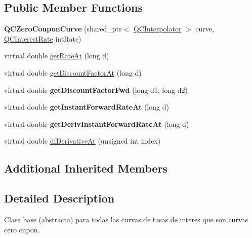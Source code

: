 \subsection*{Public Member Functions}
\begin{DoxyCompactItemize}
\item 
\hypertarget{class_q_c_zero_coupon_curve_a10de10b602b24f3d9bc73fbbe87f8e35}{{\bfseries Q\+C\+Zero\+Coupon\+Curve} (shared\+\_\+ptr$<$ \hyperlink{class_q_c_interpolator}{Q\+C\+Interpolator} $>$ curve, \hyperlink{class_q_c_interest_rate}{Q\+C\+Interest\+Rate} int\+Rate)}\label{class_q_c_zero_coupon_curve_a10de10b602b24f3d9bc73fbbe87f8e35}

\item 
virtual double \hyperlink{class_q_c_zero_coupon_curve_a83289d8e7ef3cacdc407820b715d9b19}{get\+Rate\+At} (long d)
\item 
virtual double \hyperlink{class_q_c_zero_coupon_curve_ac7546a18d2fe462e14ddae2d8c87b7c5}{get\+Discount\+Factor\+At} (long d)
\item 
\hypertarget{class_q_c_zero_coupon_curve_afebbe4bb5a7b76f3914842c212704fc1}{virtual double {\bfseries get\+Discount\+Factor\+Fwd} (long d1, long d2)}\label{class_q_c_zero_coupon_curve_afebbe4bb5a7b76f3914842c212704fc1}

\item 
\hypertarget{class_q_c_zero_coupon_curve_afa4667c45b9f07890f2ea4dd194c7470}{virtual double {\bfseries get\+Instant\+Forward\+Rate\+At} (long d)}\label{class_q_c_zero_coupon_curve_afa4667c45b9f07890f2ea4dd194c7470}

\item 
\hypertarget{class_q_c_zero_coupon_curve_a10067b1cccec8446ad5d540d69605d42}{virtual double {\bfseries get\+Deriv\+Instant\+Forward\+Rate\+At} (long d)}\label{class_q_c_zero_coupon_curve_a10067b1cccec8446ad5d540d69605d42}

\item 
virtual double \hyperlink{class_q_c_zero_coupon_curve_afe641c34018bcc867b498f67e7c7d19d}{df\+Derivative\+At} (unsigned int index)
\end{DoxyCompactItemize}
\subsection*{Additional Inherited Members}


\subsection{Detailed Description}
Clase base (abstracta) para todas las curvas de tasas de interes que son curvas cero cupon. 

